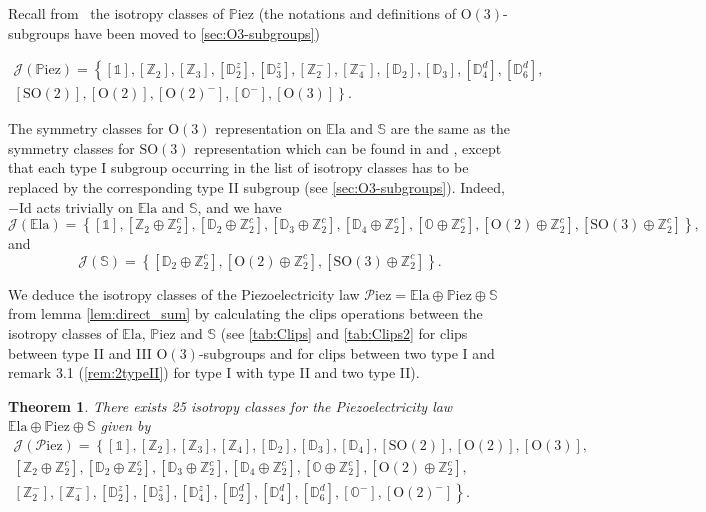 \documentclass[11pt,a4paper]{amsart}
\newtheorem{thm}{Theorem}[section]
\theoremstyle{definition}
\newcommand{\ZZ}{\mathbb{Z}}                %
\newcommand{\Ela}{\mathbb{E}\mathrm{la}}    %
\newcommand{\Piez}{\mathbb{P}\mathrm{iez}}  %
\newcommand{\Sym}{\mathbb{S}}               %
\newcommand{\J}{\mathcal{J}}                %
\newcommand{\OO}{\mathrm{O}}                %
\newcommand{\SO}{\mathrm{SO}}               %
\newcommand{\octa}{\mathbb{O}}              %
\newcommand{\DD}{\mathbb{D}}                %
\newcommand{\1}{\mathds{1}}		            %
\newcommand{\id}{\mathrm{Id}}                %
\newcommand{\set}[1]{\left\{#1\right\}}     %
\begin{document}
Recall from~\cite{Olive2021} the isotropy classes of $\Piez$ (the notations and definitions of $\OO(3)$-subgroups have been moved to \autoref{sec:O3-subgroups})

\begin{multline*}
  \J(\Piez)=\left\{[\1],[\ZZ_2],[\ZZ_3],[\DD_2^z],[\DD_3^z],[\ZZ_2^{-}],[\ZZ_4^-],[\DD_2],[\DD_3],[\DD_4^d],[\DD_6^d],\right.\\
  \left.[\SO(2)],[\OO(2)],[\OO(2)^-],[\octa^-],[\OO(3)]\right\}.
\end{multline*}

The symmetry classes for $\OO(3)$ representation on $\Ela$ and $\Sym$ are the same as the symmetry classes for $\SO(3)$ representation which can be found in \cite{forte1997symmetry} and \cite{OKDD2018a}, except that each type I subgroup occurring in the list of isotropy classes has to be replaced by the corresponding type II subgroup (see \autoref{sec:O3-subgroups}). Indeed, $-\id$ acts trivially on $\Ela$ and $\Sym$, and we have
\begin{equation*}
  \J(\Ela)=\set{[\1],[\ZZ_2\oplus \ZZ_2^c],[\DD_2\oplus \ZZ_2^c],[\DD_3\oplus \ZZ_2^c],[\DD_4\oplus \ZZ_2^c],[\octa\oplus \ZZ_2^c],[\OO(2)\oplus \ZZ_2^c],[\SO(3)\oplus \ZZ_2^c]},
\end{equation*}
and
\begin{equation*}
  \J(\Sym)=\set{[\DD_2\oplus \ZZ_2^c],[\OO(2)\oplus\ZZ_2^c],[\SO(3)\oplus \ZZ_2^c]}.
\end{equation*}

We deduce the isotropy classes of the Piezoelectricity law $\mathcal{P}\text{iez}=\Ela \oplus \Piez \oplus \Sym$ from lemma \ref{lem:direct_sum} by calculating the clips operations between the isotropy classes of $\Ela$, $\Piez$ and $\Sym$ (see \autoref{tab:Clips} and \autoref{tab:Clips2} for clips between type II and III $\OO(3)$-subgroups and \cite[table 1]{Olive2019} for clips between two type I and remark 3.1 (\ref{rem:2typeII}) for type I with type II and two type II).

\begin{thm}\label{lem:J(Piez)}
  There exists 25 isotropy classes for the Piezoelectricity law $\Ela \oplus \Piez \oplus \Sym$ given by
  \begin{multline*}
    \J(\mathcal{P}\text{iez})=\left\{[\1],[\ZZ_2],[\ZZ_3],[\ZZ_4],[\DD_2],[\DD_3],[\DD_4],[\SO(2)],[\OO(2)],[\OO(3)],\right. \\
    \left.[\ZZ_2\oplus \ZZ_2^c],[\DD_2\oplus \ZZ_2^c],[\DD_3\oplus \ZZ_2^c], [\DD_4\oplus \ZZ_2^c],[\octa\oplus \ZZ_2^c],[\OO(2)\oplus \ZZ_2^c], \right. \\
    \left.[\ZZ_2^-],[\ZZ_4^-],[\DD_2^z],
    [\DD_3^z],[\DD_4^z],[\DD_2^d],[\DD_4^d],[\DD_6^d],[\octa^-],[\OO(2)^-]\right\}.
  \end{multline*}
\end{thm}
\end{document}
